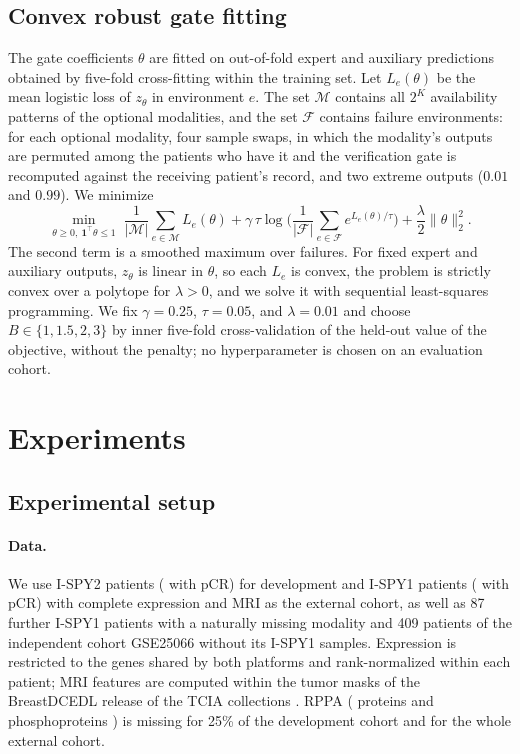 \documentclass[a4paper,runningheads]{llncs}
\begin{document}
\subsection{Convex robust gate fitting}

The gate coefficients $\theta$ are fitted on out-of-fold expert and auxiliary predictions obtained by five-fold cross-fitting within the training set. Let $L_e(\theta)$ be the mean logistic loss of $z_\theta$ in environment $e$. The set $\mathcal M$ contains all $2^K$ availability patterns of the optional modalities, and the set $\mathcal F$ contains failure environments: for each optional modality, four sample swaps, in which the modality's outputs are permuted among the patients who have it and the verification gate is recomputed against the receiving patient's record, and two extreme outputs ($0.01$ and $0.99$). We minimize
\begin{equation}
 \min_{\theta\ge0,\ \mathbf 1^\top\theta\le1}\;
 \frac1{|\mathcal M|}\sum_{e\in\mathcal M}L_e(\theta)
 +\gamma\,\tau\log\Big(\frac1{|\mathcal F|}\sum_{e\in\mathcal F}e^{L_e(\theta)/\tau}\Big)
 +\frac\lambda2\|\theta\|_2^2 .
 \label{eq:objective}
\end{equation}
The second term is a smoothed maximum over failures. For fixed expert and auxiliary outputs, $z_\theta$ is linear in $\theta$, so each $L_e$ is convex, the problem is strictly convex over a polytope for $\lambda>0$, and we solve it with sequential least-squares programming. We fix $\gamma=0.25$, $\tau=0.05$, and $\lambda=0.01$ and choose $B\in\{1,1.5,2,3\}$ by inner five-fold cross-validation of the held-out value of the objective, without the penalty; no hyperparameter is chosen on an evaluation cohort.

\section{Experiments}

\subsection{Experimental setup}

\paragraph{Data.} We use \NDev{} I-SPY2 patients (\NDevPos{} with pCR) for development and \NExt{} I-SPY1 patients (\NExtPos{} with pCR) with complete expression and MRI as the external cohort, as well as 87 further I-SPY1 patients with a naturally missing modality and 409 patients of the independent cohort GSE25066 \cite{hatzis2011} without its I-SPY1 samples. Expression is restricted to the \NGenes{} genes shared by both platforms and rank-normalized within each patient; MRI features are computed within the tumor masks of the BreastDCEDL release \cite{fridman2026} of the TCIA collections \cite{tciaispy1,tciaispy2}. RPPA (\NRppaFeat{} proteins and phosphoproteins \cite{wolf2022ispy}) is missing for 25\% of the development cohort and for the whole external cohort.
\end{document}
